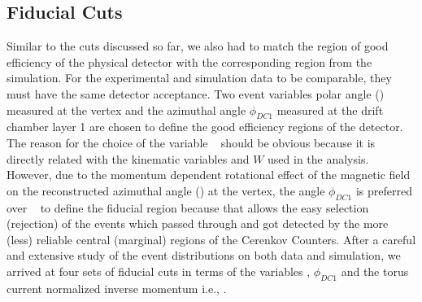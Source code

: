 \subsection{Fiducial Cuts}
\label{fidCuts}

Similar to the cuts discussed so far, we also had to match the region of good efficiency of the physical detector with the corresponding region from the simulation. For the experimental and simulation data to be comparable, they must have the same detector acceptance. %
Two event variables polar angle (\thvtx) measured at the vertex and the azimuthal angle $\phi_{DC1}$ measured at the drift chamber layer 1 are chosen to define the good efficiency regions of the detector. The reason for the choice of the variable \thvtx~ should be obvious because it is directly related with the kinematic variables \qsqs and $W$ used in the analysis. However, due to the momentum dependent rotational effect of the magnetic field on the reconstructed azimuthal angle (\phvtx) at the vertex, the angle $\phi_{DC1}$ is preferred over \phvtx~ to define the fiducial region because that allows the easy selection (rejection) of the events which passed through and got detected by the more (less) reliable central (marginal) regions of the Cerenkov Counters. %
After a careful and extensive study of the event distributions on both data and simulation, we arrived at four sets of fiducial cuts in terms of the variables \thvtx, $\phi_{DC1}$ and the torus current normalized inverse momentum i.e., \invP.%

